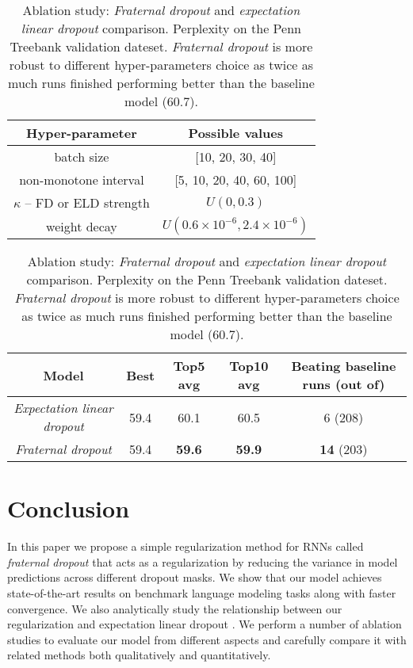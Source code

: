 \documentclass{article} \usepackage{iclr2018_conference,times}
\begin{document}
\begin{table}[t]
\vspace{-0.08cm}
\centering
\begin{tabular}{c | c } 
\textbf{Hyper-parameter} & \textbf{Possible values}\\
\hline
batch size & [10, 20, 30, 40]\\
non-monotone interval & [5, 10, 20, 40, 60, 100]\\
$\kappa$ -- FD or ELD strength & $U(0,0.3)$\\
weight decay & $U(0.6 \times 10^{-6} ,2.4 \times 10^{-6})$
\vspace{-0.08cm}
\end{tabular}
\caption{Ablation study: Candidate hyper-parameters possible used in the grid search for comparing \emph{fraternal dropout} and \emph{expectation linear dropout}. $U(a,b)$ is the uniform distribution on the interval $[a,b]$. For finite sets, each value is drawn with equal probability.}
\label{table:FDvsELD}

\vspace{0.65cm}
\centering
\begin{tabular}{ c|c c c c}
\textbf{Model} & \textbf{Best} & \textbf{Top5 avg} & \textbf{Top10 avg} & \textbf{Beating baseline runs (out of)}\\
\hline
\emph{Expectation linear dropout} & 59.4 & 60.1 & 60.5 & 6 (208)\\
\emph{Fraternal dropout} & 59.4 & \textbf{59.6} & \textbf{59.9} & \textbf{14} (203)\\
\end{tabular}
\caption{Ablation study: \emph{Fraternal dropout} and \emph{expectation linear dropout} comparison. Perplexity on the Penn Treebank validation dateset. \emph{Fraternal dropout} is more robust to different hyper-parameters choice as twice as much runs finished performing better than the baseline model (60.7).}
\label{table:FDvsELDresults}
\vspace{-0.08cm}
\end{table}

\section{Conclusion}
In this paper we propose a simple regularization method for RNNs called \emph{fraternal dropout} that acts as a regularization by reducing the variance in model predictions across different dropout masks. We show that our model achieves state-of-the-art results on benchmark language modeling tasks along with faster convergence. We also analytically study the relationship between our regularization and expectation linear dropout \cite{ma2016dropout}. We perform a number of ablation studies to evaluate our model from different aspects and carefully compare it with related methods both qualitatively and quantitatively.
\end{document}
